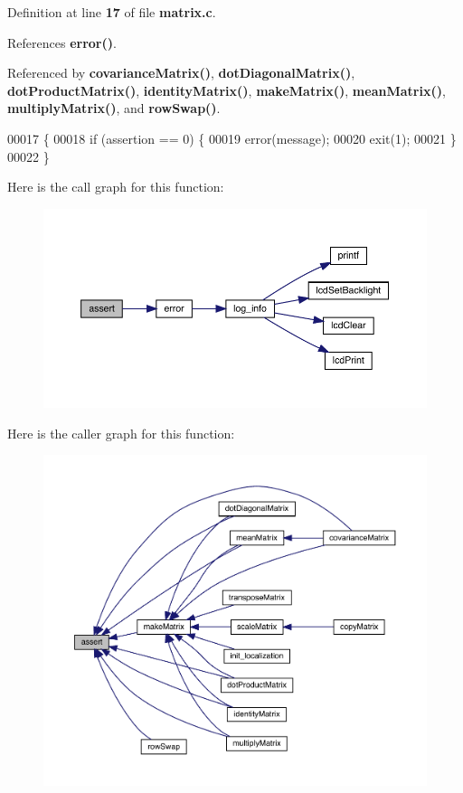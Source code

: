 Definition at line \textbf{ 17} of file \textbf{ matrix.\+c}.



References \textbf{ error()}.



Referenced by \textbf{ covariance\+Matrix()}, \textbf{ dot\+Diagonal\+Matrix()}, \textbf{ dot\+Product\+Matrix()}, \textbf{ identity\+Matrix()}, \textbf{ make\+Matrix()}, \textbf{ mean\+Matrix()}, \textbf{ multiply\+Matrix()}, and \textbf{ row\+Swap()}.


\begin{DoxyCode}
00017                                                 \{
00018   \textcolor{keywordflow}{if} (assertion == 0) \{
00019     error(message);
00020     exit(1);
00021   \}
00022 \}
\end{DoxyCode}
Here is the call graph for this function\+:
\nopagebreak
\begin{figure}[H]
\begin{center}
\leavevmode
\includegraphics[width=350pt]{matrix_8h_a8e41e30382335ea89f90b72db0b44d6f_cgraph}
\end{center}
\end{figure}
Here is the caller graph for this function\+:
\nopagebreak
\begin{figure}[H]
\begin{center}
\leavevmode
\includegraphics[width=350pt]{matrix_8h_a8e41e30382335ea89f90b72db0b44d6f_icgraph}
\end{center}
\end{figure}
\mbox{\label{matrix_8h_abbb8d2d20c2dd53a2269d017a336668f}} 
